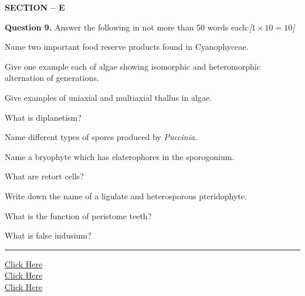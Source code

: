 \documentclass[11pt,a4paper]{article}
\newcommand{\pts}[1]{\hfill   \textit{[#1]}}
\begin{document}
\pagebreak

\begin{center}
   \textbf{SECTION -- E}
\end{center}

\medskip


\noindent   \textbf{Question 9.} Answer the following in not more than 50 words each:\pts{$1  \times 10 = 10$}

\begin{parts}
  \item Name two important food reserve products found in Cyanophyceae.
  \item Give one example each of algae showing isomorphic and heteromorphic alternation of generations.
  \item Give examples of uniaxial and multiaxial thallus in algae.
  \item What is diplanetism?
  \item Name different types of spores produced by   \textit{Puccinia}.
  \item Name a bryophyte which has elaterophores in the sporogonium.
  \item What are retort cells?
  \item Write down the name of a ligulate and heterosporous pteridophyte.
  \item What is the function of peristome teeth?
  \item What is false indusium?
\end{parts}

\vfill
\rule{\linewidth}{0.4pt}

\begin{center}\small
\href{https://bhu-exam.vercel.app/}{Click Here}\\[4pt]\href{https://me-aryan.vercel.app/}{Click Here}\\[4pt]\href{https://quashan-me.vercel.app/}{Click Here}
\end{center}
\end{document}
